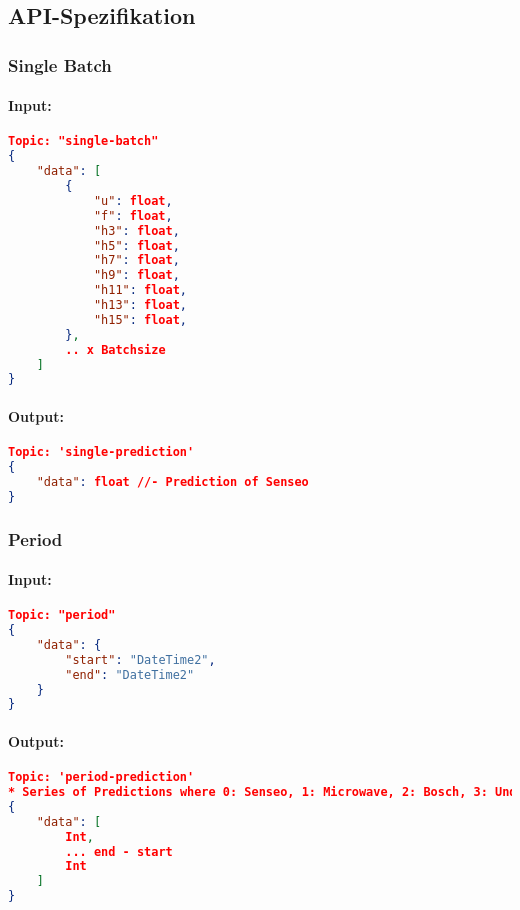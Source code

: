     \subsection{API-Spezifikation}\label{API-Spezifikation}
        \subsubsection{Single Batch}
        \paragraph{Input:}

            \begin{lstlisting}[language=json,firstnumber=1]
Topic: "single-batch"
{
    "data": [
        {
            "u": float,
            "f": float,
            "h3": float,
            "h5": float,
            "h7": float,
            "h9": float,
            "h11": float,
            "h13": float,
            "h15": float,
        },
        .. x Batchsize
    ]
}
            \end{lstlisting}
        
            \paragraph{Output:}
        
            \begin{lstlisting}[language=json,firstnumber=1]
Topic: 'single-prediction'
{
    "data": float //- Prediction of Senseo
}
            \end{lstlisting}
    
        \subsubsection{Period}
            \paragraph{Input:}
    
                \begin{lstlisting}[language=json,firstnumber=1]
Topic: "period"
{
    "data": {
        "start": "DateTime2",
        "end": "DateTime2"
    }
}
                \end{lstlisting}
            
                \paragraph{Output:}
            
                \begin{lstlisting}[language=json,firstnumber=1]
Topic: 'period-prediction'
* Series of Predictions where 0: Senseo, 1: Microwave, 2: Bosch, 3: Undefined, for every second
{
    "data": [
        Int,
        ... end - start
        Int
    ]
}
                \end{lstlisting}
